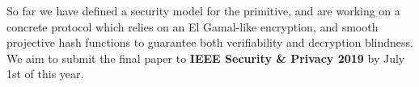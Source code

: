 \documentclass[11pt]{llncs}
\begin{document}
 So far we have defined a security model for the primitive, and are working on a concrete protocol which relies on an El Gamal-like encryption, and smooth projective hash functions to guarantee both verifiability and decryption blindness. We aim to submit the final paper to \textbf{IEEE Security \& Privacy 2019} by July 1st of this year.
 
 



		
\end{document}
